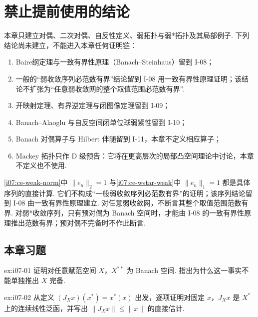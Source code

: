 \section{禁止提前使用的结论}\label{sec:i07-deferred-results}

\begin{FAWarning}[延后结果边界]
本章只建立对偶、二次对偶、自反性定义、弱拓扑与弱*拓扑及其局部例子. 下列结论尚未建立，不能进入本章任何证明链：
\begin{enumerate}[label=\textnormal{(\roman*)}]
\item Baire纲定理与一致有界性原理（Banach--Steinhaus）留到 I-08；
\item 一般的“弱收敛序列必范数有界”结论留到 I-08 用一致有界性原理证明；该结论不扩张为“任意弱收敛网的整个取值范围必范数有界”.
\item 开映射定理、有界逆定理与闭图像定理留到 I-09；
\item Banach--Alaoglu 与自反空间闭单位球弱紧性留到 I-10；
\item Banach 对偶算子与 Hilbert 伴随留到 I-11，本章不定义相应算子；
\item Mackey 拓扑只作 D 级预告：它将在更高层次的局部凸空间理论中讨论，本章不定义也不使用.
\end{enumerate}
\end{FAWarning}

\begin{FARemark}[关于有界性的逻辑位置]
\autoref{i07:ce-weak-norm}中 \(\displaystyle \|e_n\|_2=1\) 与\autoref{i07:ce-wstar-weak}中 \(\displaystyle \|e_n\|_1=1\) 都是具体序列的直接计算. 它们不构成“一般弱收敛序列必范数有界”的证明；该序列结论留到 I-08 由一致有界性原理建立. 对任意弱收敛网，不断言其整个取值范围范数有界. 对弱*收敛序列，只有预对偶为 Banach 空间时，才能由 I-08 的一致有界性原理推出范数有界；预对偶不完备时不作此断言.
\end{FARemark}

\subsection{本章习题}\label{sec:i07-exercises}

\begin{FAExercise}[二次对偶的完备性]{ex:i07-01}
证明对任意赋范空间 \(\displaystyle X\)，\(\displaystyle X^{**}\) 为 Banach 空间. 指出为什么这一事实不能单独推出 \(\displaystyle X\) 完备.
\end{FAExercise}

\begin{FAExercise}[自然嵌入的逐点线性]{ex:i07-02}
从定义 \(\displaystyle (J_Xx)(x^*)=x^*(x)\) 出发，逐项证明对固定 \(\displaystyle x\)，\(\displaystyle J_Xx\) 是 \(\displaystyle X^*\) 上的连续线性泛函，并写出 \(\displaystyle \|J_Xx\|\leqslant\|x\|\) 的直接估计.
\end{FAExercise}

